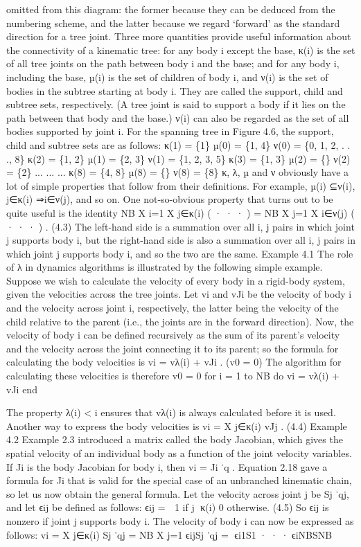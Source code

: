 omitted from this diagram: the former because they can be deduced from the numbering scheme, and the latter because we regard ‘forward’ as the standard direction for a tree joint. Three more quantities provide useful information about the connectivity of a kinematic tree: for any body i except the base, κ(i) is the set of all tree joints on the path between body i and the base; and for any body i, including the base, µ(i) is the set of children of body i, and ν(i) is the set of bodies in the subtree starting at body i. They are called the support, child and subtree sets, respectively. (A tree joint is said to support a body if it lies on the path between that body and the base.) ν(i) can also be regarded as the set of all bodies supported by joint i. For the spanning tree in Figure 4.6, the support, child and subtree sets are as follows: κ(1) = \{1\} µ(0) = \{1, 4\} ν(0) = \{0, 1, 2, . . ., 8\} κ(2) = \{1, 2\} µ(1) = \{2, 3\} ν(1) = \{1, 2, 3, 5\} κ(3) = \{1, 3\} µ(2) = \{\} ν(2) = \{2\} ... ... ... κ(8) = \{4, 8\} µ(8) = \{\} ν(8) = \{8\} κ, λ, µ and ν obviously have a lot of simple properties that follow from their definitions. For example, µ(i) ⊆ν(i), j∈κ(i) ⇒i∈ν(j), and so on. One not-so-obvious property that turns out to be quite useful is the identity NB X i=1 X j∈κ(i) ( · · · ) = NB X j=1 X i∈ν(j) ( · · · ) . (4.3) The left-hand side is a summation over all i, j pairs in which joint j supports body i, but the right-hand side is also a summation over all i, j pairs in which joint j supports body i, and so the two are the same. Example 4.1 The role of λ in dynamics algorithms is illustrated by the following simple example. Suppose we wish to calculate the velocity of every body in a rigid-body system, given the velocities across the tree joints. Let vi and vJi be the velocity of body i and the velocity across joint i, respectively, the latter being the velocity of the child relative to the parent (i.e., the joints are in the forward direction). Now, the velocity of body i can be defined recursively as the sum of its parent’s velocity and the velocity across the joint connecting it to its parent; so the formula for calculating the body velocities is vi = vλ(i) + vJi . (v0 = 0) The algorithm for calculating these velocities is therefore v0 = 0 for i = 1 to NB do vi = vλ(i) + vJi end

The property λ(i) < i ensures that vλ(i) is always calculated before it is used. Another way to express the body velocities is vi = X j∈κ(i) vJj . (4.4) Example 4.2 Example 2.3 introduced a matrix called the body Jacobian, which gives the spatial velocity of an individual body as a function of the joint velocity variables. If Ji is the body Jacobian for body i, then vi = Ji ˙q . Equation 2.18 gave a formula for Ji that is valid for the special case of an unbranched kinematic chain, so let us now obtain the general formula. Let the velocity across joint j be Sj ˙qj, and let ϵij be defined as follows: ϵij =  1 if j ∈κ(i) 0 otherwise. (4.5) So ϵij is nonzero if joint j supports body i. The velocity of body i can now be expressed as follows: vi = X j∈κ(i) Sj ˙qj = NB X j=1 ϵijSj ˙qj = ϵi1S1 · · · ϵiNBSNB 

